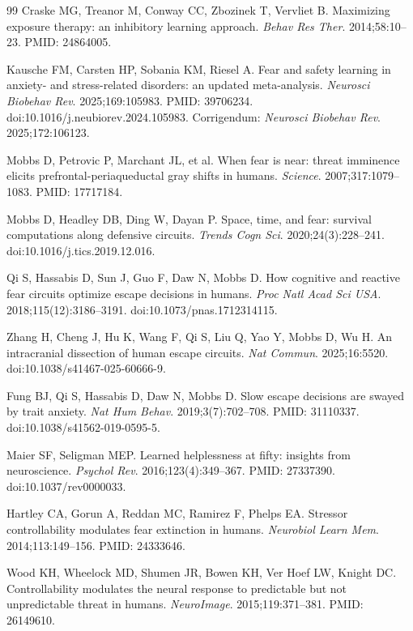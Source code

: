 \documentclass[9pt,twocolumn]{article}
\begin{document}
\begin{thebibliography}{99}
Craske MG, Treanor M, Conway CC, Zbozinek T, Vervliet B. Maximizing exposure therapy: an inhibitory learning approach. \emph{Behav Res Ther}. 2014;58:10--23. PMID: 24864005.

Kausche FM, Carsten HP, Sobania KM, Riesel A. Fear and safety learning in anxiety- and stress-related disorders: an updated meta-analysis. \emph{Neurosci Biobehav Rev}. 2025;169:105983. PMID: 39706234. doi:10.1016/j.neubiorev.2024.105983. Corrigendum: \emph{Neurosci Biobehav Rev}. 2025;172:106123.

Mobbs D, Petrovic P, Marchant JL, et al. When fear is near: threat imminence elicits prefrontal-periaqueductal gray shifts in humans. \emph{Science}. 2007;317:1079--1083. PMID: 17717184.

Mobbs D, Headley DB, Ding W, Dayan P. Space, time, and fear: survival computations along defensive circuits. \emph{Trends Cogn Sci}. 2020;24(3):228--241. doi:10.1016/j.tics.2019.12.016.

Qi S, Hassabis D, Sun J, Guo F, Daw N, Mobbs D. How cognitive and reactive fear circuits optimize escape decisions in humans. \emph{Proc Natl Acad Sci USA}. 2018;115(12):3186--3191. doi:10.1073/pnas.1712314115.

Zhang H, Cheng J, Hu K, Wang F, Qi S, Liu Q, Yao Y, Mobbs D, Wu H. An intracranial dissection of human escape circuits. \emph{Nat Commun}. 2025;16:5520. doi:10.1038/s41467-025-60666-9.

Fung BJ, Qi S, Hassabis D, Daw N, Mobbs D. Slow escape decisions are swayed by trait anxiety. \emph{Nat Hum Behav}. 2019;3(7):702--708. PMID: 31110337. doi:10.1038/s41562-019-0595-5.

Maier SF, Seligman MEP. Learned helplessness at fifty: insights from neuroscience. \emph{Psychol Rev}. 2016;123(4):349--367. PMID: 27337390. doi:10.1037/rev0000033.

Hartley CA, Gorun A, Reddan MC, Ramirez F, Phelps EA. Stressor controllability modulates fear extinction in humans. \emph{Neurobiol Learn Mem}. 2014;113:149--156. PMID: 24333646.

Wood KH, Wheelock MD, Shumen JR, Bowen KH, Ver Hoef LW, Knight DC. Controllability modulates the neural response to predictable but not unpredictable threat in humans. \emph{NeuroImage}. 2015;119:371--381. PMID: 26149610.


\end{thebibliography}
\end{document}
